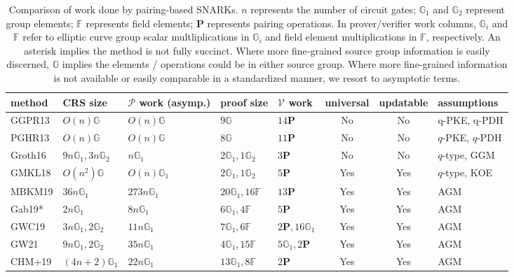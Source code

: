 \begin{table}[!t]
\caption{Comparison of work done by pairing-based SNARKs. 
$n$ represents the number of circuit gates; $\mathbb{G}_1$ and 
$\mathbb{G}_2$ represent group elements; $\mathbb{F}$ represents field elements; $\mathbf{P}$ represents pairing operations. 
In prover/verifier work columns, $\mathbb{G}_i$ and $\mathbb{F}$ refer to elliptic curve group scalar multliplications in $\mathbb{G}_i$ 
and field element multiplications in $\mathbb{F}$, respectively. An asterisk implies the method is not fully succinct. Where more fine-grained 
source group information is easily discerned, $\mathbb{G}$ implies the elements / operations could be in either source group.
Where more fine-grained information is not available or easily comparable in a standardized manner, we resort to asymptotic terms.}
\label{tbl:snark}
\begin{tabular}{|l|l|l|p{3.2cm}|l|c|c|l|}
\hline
\toprule
method & CRS size & $\mathcal{P}$ work (asymp.) & proof size & $\mathcal{V}$ work & universal & updatable & assumptions \\ \hline\toprule
\midrule
GGPR13 & $O(n) \mathbb{G}$ & $O(n) \mathbb{G}$ & $9 \mathbb{G}$ & $14 \mathbf{P}$ & No & No & q-PKE, q-PDH \\ \hline
PGHR13 & $O(n) \mathbb{G}$ & $O(n) \mathbb{G}$ & $8 \mathbb{G}$ & $11 \mathbf{P}$ & No & No & $q$-PKE, $q$-PDH \\ \hline
Groth16 & $9n \mathbb{G}_1, 3n \mathbb{G}_2$ & $n \mathbb{G}_1$ & $2 \mathbb{G}_1, 1 \mathbb{G}_2$ & $3 \mathbf{P}$ & No & No & $q$-type, GGM \\ \hline
GMKL18 & $O(n^2) \mathbb{G}$ & $O(n) \mathbb{G}_1$ & $2 \mathbb{G}_1, 1 \mathbb{G}_2$ & $5 \mathbf{P}$ & Yes & Yes & $q$-type, KOE \\ \hline
MBKM19 & $36n \mathbb{G}_1$ & $273n \mathbb{G}_1$ & $20 \mathbb{G}_1, 16 \mathbb{F}$ & $13 \mathbf{P}$ & Yes & Yes & AGM \\ \hline
Gab19* & $2n \mathbb{G}_1$ & $8n \mathbb{G}_1$ & $6 \mathbb{G}_1, 4 \mathbb{F}$ & $5 \mathbf{P}$ & Yes & Yes & AGM \\ \hline
GWC19 & $3n \mathbb{G}_1, 2 \mathbb{G}_2$ & $11n \mathbb{G}_1$ & $7 \mathbb{G}_1, 6 \mathbb{F}$ & $2 \mathbf{P}, 16 \mathbb{G}_1$ & Yes & Yes & AGM \\ \hline
GW21 & $9n \mathbb{G}_1, 2 \mathbb{G}_2$ & $35n \mathbb{G}_1$ & $4 \mathbb{G}_1, 15 \mathbb{F}$ & $5 \mathbb{G}_1, 2 \mathbf{P}$ & Yes & Yes & AGM \\ \hline
CHM+19 & $(4n +2) \mathbb{G}_1$ & $22n \mathbb{G}_1$ & $13 \mathbb{G}_1, 8 \mathbb{F}$ & $2 \mathbf{P}$ & Yes & Yes & AGM \\ \hline\bottomrule
\bottomrule
\bottomrule
\end{tabular}
\end{table}
